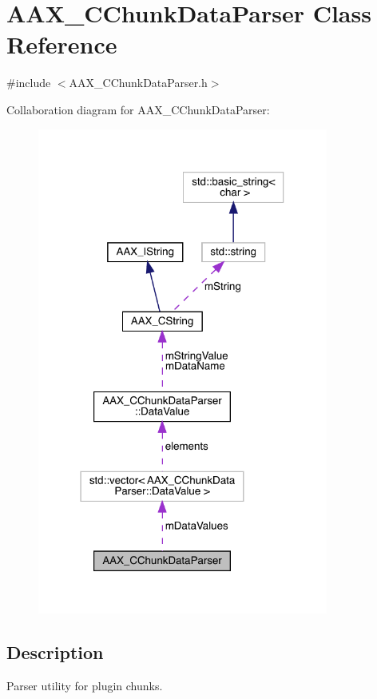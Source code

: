 \hypertarget{a01461}{}\section{A\+A\+X\+\_\+\+C\+Chunk\+Data\+Parser Class Reference}
\label{a01461}


{\ttfamily \#include $<$A\+A\+X\+\_\+\+C\+Chunk\+Data\+Parser.\+h$>$}



Collaboration diagram for A\+A\+X\+\_\+\+C\+Chunk\+Data\+Parser\+:
\nopagebreak
\begin{figure}[H]
\begin{center}
\leavevmode
\includegraphics[width=271pt]{a01459}
\end{center}
\end{figure}


\subsection{Description}
Parser utility for plugin chunks. 

